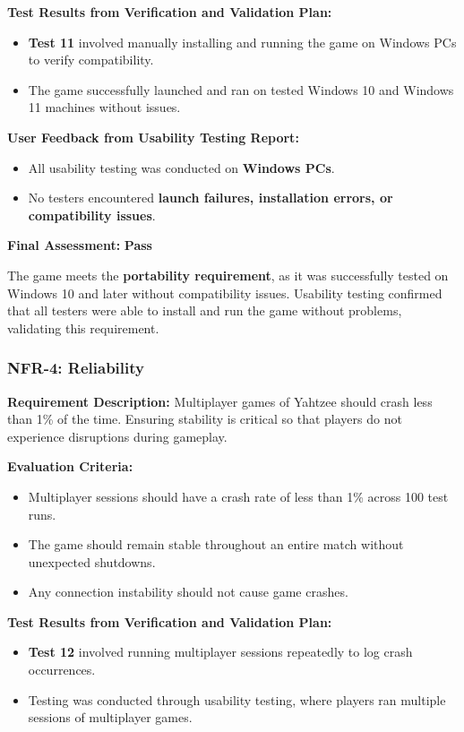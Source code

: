 \documentclass[12pt, titlepage]{article}
\begin{document}
\textbf{Test Results from Verification and Validation Plan:}  
\begin{itemize}
    \item \textbf{Test 11} involved manually installing and running the game on Windows PCs to verify compatibility.
    \item The game successfully launched and ran on tested Windows 10 and Windows 11 machines without issues.
\end{itemize}

\textbf{User Feedback from Usability Testing Report:}  
\begin{itemize}
    \item All usability testing was conducted on \textbf{Windows PCs}.
    \item No testers encountered \textbf{launch failures, installation errors, or compatibility issues}.
\end{itemize}

\textbf{Final Assessment:} \textbf{Pass}  

The game meets the \textbf{portability requirement}, as it was successfully tested on Windows 10 and later without compatibility issues. Usability testing confirmed that all testers were able to install and run the game without problems, validating this requirement.


\subsubsection{NFR-4: Reliability}
\label{NFR4}

\textbf{Requirement Description:}  
Multiplayer games of Yahtzee should crash less than 1\% of the time. Ensuring stability is critical so that players do not experience disruptions during gameplay.

\textbf{Evaluation Criteria:}  
\begin{itemize}
    \item Multiplayer sessions should have a crash rate of less than 1\% across 100 test runs.
    \item The game should remain stable throughout an entire match without unexpected shutdowns.
    \item Any connection instability should not cause game crashes.
\end{itemize}

\textbf{Test Results from Verification and Validation Plan:}  
\begin{itemize}
    \item \textbf{Test 12} involved running multiplayer sessions repeatedly to log crash occurrences.
    \item Testing was conducted through usability testing, where players ran multiple sessions of multiplayer games.
\end{itemize}
\end{document}
